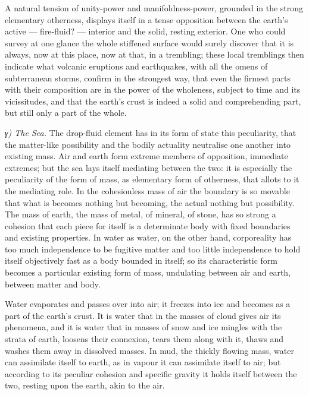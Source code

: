 \documentclass[12pt,a4paper]{book}
\newcommand{\subrunin}[1]{\emph{#1}\hspace{0.4em}}
\begin{document}
A natural tension of unity-power and manifoldness-power, grounded in the strong elementary otherness, displays itself in
a tense opposition between the earth's active --- fire-fluid? --- interior and the solid, resting exterior. One who could
survey at one glance the whole stiffened surface would surely discover that it is always, now at this place, now at that,
in a trembling; these local tremblings then indicate what volcanic eruptions and earthquakes, with all the omens of
subterranean storms, confirm in the strongest way, that even the firmest parts with their composition are in the power of
the wholeness, subject to time and its vicissitudes, and that the earth's crust is indeed a solid and comprehending part,
but still only a part of the whole.

\subrunin{γ) The Sea.} The drop-fluid element has in its form of state this peculiarity, that the matter-like possibility
and
the bodily actuality neutralise one another into existing mass. Air and earth form extreme members of opposition,
immediate extremes; but the sea lays itself mediating between the two: it is especially the peculiarity of the form of
mass, as elementary form of otherness, that allots to it the mediating role. In the cohesionless mass of air the boundary
is so movable that what is becomes nothing but becoming, the actual nothing but possibility. The mass of earth, the mass
of metal, of mineral, of stone, has so strong a cohesion that each piece for itself is a determinate body with fixed
boundaries and existing properties. In water as water, on the other hand, corporeality has too much independence to be
fugitive matter and too little independence to hold itself objectively fast as a body bounded in itself; so its
characteristic form becomes a particular existing form of mass, undulating between air and earth, between matter and
body.

Water evaporates and passes over into air; it freezes into ice and becomes as a part of the earth's crust. It is water
that in the masses of cloud gives air its phenomena, and it is water that in masses of snow and ice mingles with the
strata of earth, loosens their connexion, tears them along with it, thaws and washes them away in dissolved masses. In
mud, the thickly flowing mass, water can assimilate itself to earth, as in vapour it can assimilate itself to air; but
according to its peculiar cohesion and specific gravity it holds itself between the two, resting upon the earth, akin to
the air.
\end{document}
